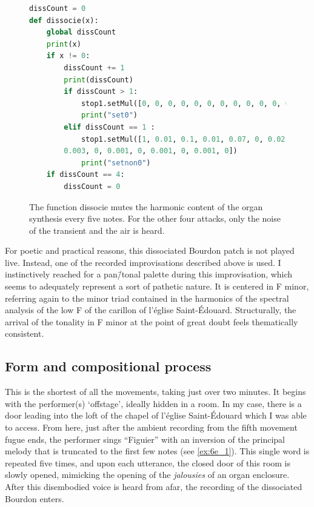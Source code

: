 \documentclass[12pt,twoside,maitrise]{dms_ks}
\theoremstyle{definition}
\begin{document}
{\begin{figure}[H]
\begin{lstlisting}[language=Python]
dissCount = 0
def dissocie(x):
    global dissCount
    print(x)
    if x != 0:
        dissCount += 1
        print(dissCount)
        if dissCount > 1:
            stop1.setMul([0, 0, 0, 0, 0, 0, 0, 0, 0, 0, 0, 0, 0, 0, 0, 0, 0, 0, 0, 0])
            print("set0")
        elif dissCount == 1 :
            stop1.setMul([1, 0.01, 0.1, 0.01, 0.07, 0, 0.02, 0, 0.01, 0, 0.003, 0,
	    0.003, 0, 0.001, 0, 0.001, 0, 0.001, 0])
            print("setnon0")
    if dissCount == 4:
        dissCount = 0
\end{lstlisting}
\caption{The function dissocie mutes the harmonic content of the organ synthesis every five notes. For the other four attacks, only the noise of the transient and the air is heard.}
\label{fig:dissocie}
\end{figure}

For poetic and practical reasons, this dissociated Bourdon patch is not played live.
Instead, one of the recorded improvisations described above is used.
I instinctively reached for a pan\=/tonal palette during this improvisation, which seems to adequately represent a sort of pathetic nature.
It is centered in F minor, referring again to the minor triad contained in the harmonics of the spectral analysis of the low F of the carillon of l'église Saint-Édouard.
Structurally, the arrival of the tonality in F minor at the point of great doubt feels thematically consistent.

\subsection{Form and compositional process}

This is the shortest of all the movements, taking just over two minutes. It begins with the performer(s) `offstage', ideally hidden in a room. In my case, there is a door leading into the loft of the chapel of l'église Saint-Édouard which I was able to access. 
From here, just after the ambient recording from the fifth movement fugue ends, the performer sings “Figuier” with an inversion of the principal melody that is truncated to the first few notes (see \cref{ex:6e_1}). 
This single word is repeated five times, and upon each utterance, the closed door of this room is slowly opened, mimicking the opening of the \textit{jalousies} of an organ enclosure.
After this disembodied voice is heard from afar, the recording of the dissociated Bourdon enters.

}
\end{document}

